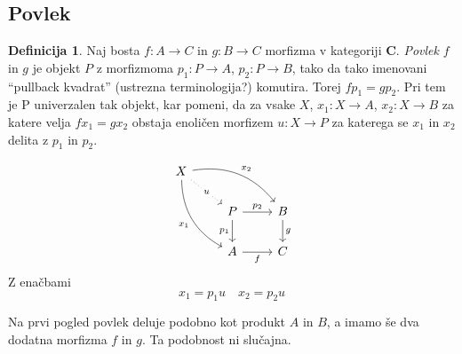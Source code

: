 \documentclass[12pt,a4paper]{book}
\theoremstyle{definition}
\newtheorem{definicija}{Definicija}[chapter]
\theoremstyle{plain}
\theoremstyle{definition}
\theoremstyle{remark}
\newcommand{\cat}[1]{\textbf{#1}}
\begin{document}
\subsection{Povlek}

\begin{definicija}
Naj bosta $f : A \to C$ in $g : B \to C$ morfizma v kategoriji $\cat{C}$. \textit{Povlek} $f$ in $g$ je objekt $P$ z morfizmoma $p_1 : P \to A$, $p_2 : P \to B$, tako da tako imenovani "`pullback kvadrat"' (ustrezna terminologija?) komutira. Torej $fp_1 = gp_2$. Pri tem je P univerzalen tak objekt, kar pomeni, da za vsake $X$, $x_1 : X \to A$, $x_2 : X \to B$ za katere velja $fx_1 = gx_2$ obstaja enoličen morfizem $u : X \to P$ za katerega se $x_1$ in $x_2$ delita z $p_1$ in $p_2$.

$$\begin{tikzcd}
X
\arrow[drr, bend left, "x_2"]
\arrow[ddr, bend right, "x_1"']
\arrow[dr, dotted, "u" description] & & \\
& P \arrow[r, "p_2"] \arrow[d, "p_1"']
& B \arrow[d, "g"] \\
& A \arrow[r, "f"']
& C
\end{tikzcd}$$
Z enačbami
$$x_1 = p_1u \quad x_2 = p_2u$$
\end{definicija}

Na prvi pogled povlek deluje podobno kot produkt $A$ in $B$, a imamo še dva dodatna morfizma $f$ in $g$. Ta podobnost ni slučajna.
\end{document}
